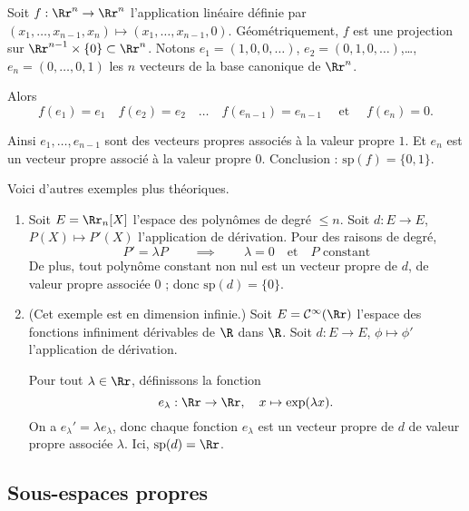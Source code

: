 \documentclass[12pt, class=report,crop=false]{standalone}
\newcommand{\Sp}{\text{sp}}
\begin{document}
\begin{exemple}
\label{ex:diagon2}
Soit $f : \Rr^n \to \Rr^n$ l'application linéaire définie
par $(x_1,\ldots,x_{n-1},x_n) \mapsto (x_1,\ldots,x_{n-1},0)$.
Géométriquement, $f$ est une projection sur $\Rr^{n-1}\times \{0\} \subset \Rr^n$.
Notons $e_1 = (1,0,0,\ldots)$, $e_2 = (0,1,0,\ldots)$,\ldots, $e_n = (0,\ldots,0,1)$ les $n$
vecteurs de la base canonique de $\Rr^n$.

Alors
$$f(e_1)=e_1 \quad f(e_2)=e_2 \quad \ldots \quad f(e_{n-1})=e_{n-1} \quad \text { et } \quad f(e_n)= 0.$$

Ainsi $e_1,\ldots,e_{n-1}$ sont des vecteurs propres associés à la valeur propre $1$.
Et $e_n$ est un vecteur propre associé à la valeur propre $0$. Conclusion : $\Sp(f) = \{0,1\}$.
\end{exemple}


Voici d'autres exemples plus théoriques.

\begin{exemple}
\sauteligne
\begin{enumerate}

  \item Soit $E=\Rr_{n}[X]$ l'espace des polynômes de degré $\le n$. Soit $d : E \to E$, $P(X) \mapsto P'(X)$
  l'application de dérivation. 
Pour des raisons de degré, 
\[P' =\lambda P \qquad \implies \qquad \lambda =0 \quad\text{et}\quad P \text{ constant}\]
De plus, tout polynôme constant non nul est un vecteur propre de $d$, de valeur propre associée $0$ ; donc 
$\Sp(d) = \{0\}$.

  \item (Cet exemple est en dimension infinie.)
   Soit $E =\mathcal{C}^\infty(\Rr)$ l'espace des fonctions infiniment dérivables de $\R$ dans $\R$. Soit 
   $d : E \to E$, $\phi \mapsto \phi'$ l'application de dérivation.

Pour tout $\lambda \in \Rr$, définissons la fonction 
\[e_\lambda : \Rr \to \Rr, \quad x \mapsto \exp(\lambda x).\]
On a $e_\lambda' = \lambda e_\lambda$, donc chaque fonction $e_\lambda$ est un vecteur propre de $d$ de valeur propre associée $\lambda$. Ici, $\Sp(d) = \Rr$.
\end{enumerate}
\end{exemple}




\subsection{Sous-espaces propres}
\end{document}
